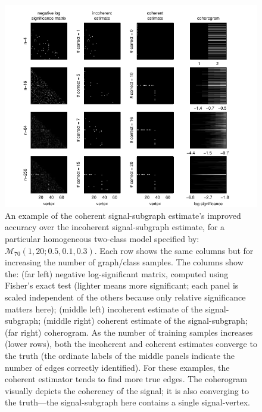 \documentclass[10pt,journal,cspaper,compsoc]{IEEEtran}
\providecommand{\mc}[1]{\mathcal{#1}}
\begin{document}
\begin{figure}[tb!]
	\centering
		\includegraphics[width=1.0\linewidth]{../figs/demo_4x4_homo_V70_s20_p10_q30.pdf}
	\caption{An example of the coherent signal-subgraph estimate's improved accuracy over the incoherent signal-subgraph estimate, for a particular homogeneous two-class model specified by: $\mc{M}_{70}(1,20;0.5,0.1,0.3)$. Each row shows the same columns but for increasing the number of graph/class samples.  The columns show the: (far left) negative log-significant matrix, computed using Fisher's exact test (lighter means more significant; each panel is scaled independent of the others because only relative significance matters here); (middle left) incoherent estimate of the signal-subgraph; (middle right) coherent estimate of the signal-subgraph; (far right) coherogram.  As the number of training samples increases (lower rows), both the incoherent and coherent estimates converge to the truth (the ordinate labels of the middle panels indicate the number of edges correctly identified).  For these examples, the coherent estimator tends to find more true edges.  The coherogram visually depicts the coherency of the signal; it is also converging to the truth---the signal-subgraph here contains a single signal-vertex.}
	\label{fig:4x4}
\end{figure}
\end{document}
